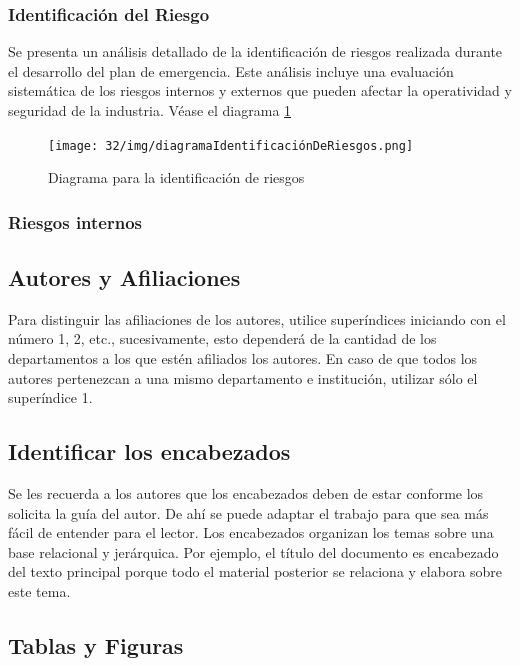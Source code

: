     \subsubsection{Identificación del Riesgo}
    Se presenta un análisis detallado de la identificación de riesgos realizada durante el desarrollo del plan de emergencia. Este análisis incluye una evaluación sistemática de los riesgos internos y externos que pueden afectar la operatividad y seguridad de la industria. Véase el diagrama  \ref{fig:identificacion-riesgos}

    \begin{figure}[H]
        \centering
        \texttt{[image: 32/img/diagramaIdentificaciónDeRiesgos.png]}
        \caption{Diagrama para la identificación de riesgos}
        \label{fig:identificacion-riesgos}
    \end{figure}
    \subsubsection{Riesgos internos}
    \subsection{Autores y Afiliaciones}
    
    Para distinguir las afiliaciones de los autores, utilice superíndices iniciando con el número 1, 2, etc., sucesivamente, esto dependerá de la cantidad de los departamentos a los que estén afiliados los autores. En caso de que todos los autores pertenezcan a una mismo departamento e institución, utilizar sólo el superíndice 1. 
    
    \subsection{Identificar los encabezados}
    
    Se les recuerda a los autores que los encabezados deben de estar conforme los solicita la guía del autor. De ahí se puede adaptar el trabajo para que sea más fácil de entender para el lector.
    Los encabezados organizan los temas sobre una base relacional y jerárquica. Por ejemplo, el título del documento es encabezado del texto principal porque todo el material posterior se relaciona y elabora sobre este tema. 
    
    \subsection{Tablas y Figuras}

